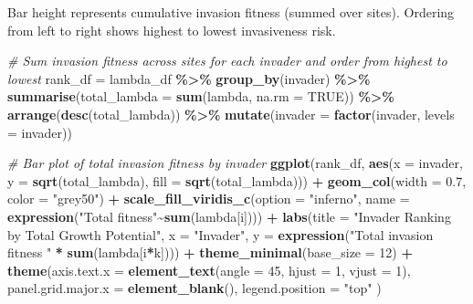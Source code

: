 \documentclass[
]{article}
\newenvironment{Shaded}{\begin{snugshade}}{\end{snugshade}}
\newcommand{\AttributeTok}[1]{\textcolor[rgb]{0.13,0.29,0.53}{#1}}
\newcommand{\CommentTok}[1]{\textcolor[rgb]{0.56,0.35,0.01}{\textit{#1}}}
\newcommand{\ConstantTok}[1]{\textcolor[rgb]{0.56,0.35,0.01}{#1}}
\newcommand{\DecValTok}[1]{\textcolor[rgb]{0.00,0.00,0.81}{#1}}
\newcommand{\FloatTok}[1]{\textcolor[rgb]{0.00,0.00,0.81}{#1}}
\newcommand{\FunctionTok}[1]{\textcolor[rgb]{0.13,0.29,0.53}{\textbf{#1}}}
\newcommand{\NormalTok}[1]{#1}
\newcommand{\OtherTok}[1]{\textcolor[rgb]{0.56,0.35,0.01}{#1}}
\newcommand{\SpecialCharTok}[1]{\textcolor[rgb]{0.81,0.36,0.00}{\textbf{#1}}}
\newcommand{\StringTok}[1]{\textcolor[rgb]{0.31,0.60,0.02}{#1}}
\begin{document}
Bar height represents cumulative invasion fitness (summed over sites).
Ordering from left to right shows highest to lowest invasiveness risk.

\begin{Shaded}
\begin{Highlighting}[]
\CommentTok{\# Sum invasion fitness across sites for each invader and order from highest to lowest}
\NormalTok{rank\_df }\OtherTok{=}\NormalTok{ lambda\_df }\SpecialCharTok{\%\textgreater{}\%}
  \FunctionTok{group\_by}\NormalTok{(invader) }\SpecialCharTok{\%\textgreater{}\%}
  \FunctionTok{summarise}\NormalTok{(}\AttributeTok{total\_lambda =} \FunctionTok{sum}\NormalTok{(lambda, }\AttributeTok{na.rm =} \ConstantTok{TRUE}\NormalTok{)) }\SpecialCharTok{\%\textgreater{}\%}
  \FunctionTok{arrange}\NormalTok{(}\FunctionTok{desc}\NormalTok{(total\_lambda)) }\SpecialCharTok{\%\textgreater{}\%}
  \FunctionTok{mutate}\NormalTok{(}\AttributeTok{invader =} \FunctionTok{factor}\NormalTok{(invader, }\AttributeTok{levels =}\NormalTok{ invader))}

\CommentTok{\# Bar plot of total invasion fitness by invader}
\FunctionTok{ggplot}\NormalTok{(rank\_df, }
       \FunctionTok{aes}\NormalTok{(}\AttributeTok{x =}\NormalTok{ invader, }\AttributeTok{y =} \FunctionTok{sqrt}\NormalTok{(total\_lambda), }\AttributeTok{fill =} \FunctionTok{sqrt}\NormalTok{(total\_lambda))) }\SpecialCharTok{+}
  \FunctionTok{geom\_col}\NormalTok{(}\AttributeTok{width =} \FloatTok{0.7}\NormalTok{, }\AttributeTok{color =} \StringTok{"grey50"}\NormalTok{) }\SpecialCharTok{+}
  \FunctionTok{scale\_fill\_viridis\_c}\NormalTok{(}\AttributeTok{option =} \StringTok{"inferno"}\NormalTok{, }
                       \AttributeTok{name =} \FunctionTok{expression}\NormalTok{(}\StringTok{"Total fitness"}\SpecialCharTok{\textasciitilde{}}\FunctionTok{sum}\NormalTok{(lambda[i]))) }\SpecialCharTok{+}
  \FunctionTok{labs}\NormalTok{(}\AttributeTok{title =} \StringTok{"Invader Ranking by Total Growth Potential"}\NormalTok{,}
       \AttributeTok{x =} \StringTok{"Invader"}\NormalTok{,}
       \AttributeTok{y =} \FunctionTok{expression}\NormalTok{(}\StringTok{"Total invasion fitness "} \SpecialCharTok{*} \FunctionTok{sum}\NormalTok{(lambda[i}\SpecialCharTok{*}\NormalTok{k]))) }\SpecialCharTok{+}
  \FunctionTok{theme\_minimal}\NormalTok{(}\AttributeTok{base\_size =} \DecValTok{12}\NormalTok{) }\SpecialCharTok{+}
  \FunctionTok{theme}\NormalTok{(}\AttributeTok{axis.text.x =} \FunctionTok{element\_text}\NormalTok{(}\AttributeTok{angle =} \DecValTok{45}\NormalTok{, }\AttributeTok{hjust =} \DecValTok{1}\NormalTok{, }\AttributeTok{vjust =} \DecValTok{1}\NormalTok{),}
        \AttributeTok{panel.grid.major.x =} \FunctionTok{element\_blank}\NormalTok{(),}
        \AttributeTok{legend.position =} \StringTok{"top"}
\NormalTok{  )}
\end{Highlighting}
\end{Shaded}
\end{document}
